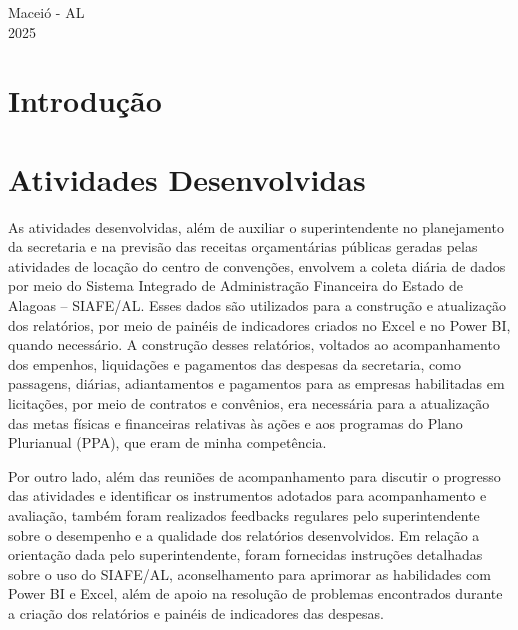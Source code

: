 \documentclass[12pt,a4paper]{article}
\begin{document}
	\vfill
	\begin{flushright}
		\centering Maceió - AL \\
		2025
	\end{flushright}
	
	\newpage
	
	\section{Introdução}
	
	\hspace*{1,5cm}
	
	\section{Atividades Desenvolvidas}
	


	\hspace*{1,5cm} As atividades desenvolvidas, além de auxiliar o superintendente no planejamento da secretaria e 
	na previsão das receitas orçamentárias públicas geradas pelas atividades de locação do centro de convenções, 
	envolvem a coleta diária de dados por meio do Sistema Integrado de Administração Financeira do Estado de Alagoas – SIAFE/AL. 
	Esses dados são utilizados para a construção e atualização dos relatórios, por meio de painéis de indicadores criados no Excel e no Power BI, 
	quando necessário. A construção desses relatórios, voltados ao acompanhamento dos empenhos, liquidações e 
	pagamentos das despesas da secretaria, como passagens, diárias, adiantamentos e pagamentos para as empresas
	habilitadas em licitações, por meio de contratos e convênios, era necessária para a atualização das metas 
 	físicas e financeiras relativas às ações e aos programas do Plano Plurianual (PPA), que eram de minha competência.  
	
	Por outro lado, além das reuniões de acompanhamento para discutir o progresso das atividades
	e identificar os instrumentos adotados para acompanhamento e avaliação, também foram realizados 
	feedbacks regulares pelo superintendente sobre o desempenho e a qualidade dos relatórios desenvolvidos. 
	Em relação a orientação dada pelo superintendente, foram fornecidas instruções detalhadas sobre o uso do SIAFE/AL, 
	aconselhamento para aprimorar as habilidades com Power BI e Excel, além de apoio na 
	resolução de problemas encontrados durante a criação dos relatórios e painéis de indicadores das despesas.  
 	
\end{document}
